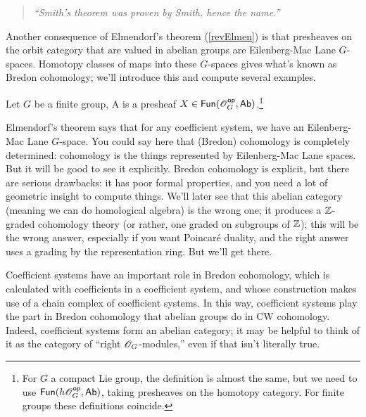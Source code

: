 
\begin{quote}\textit{
	``Smith's theorem was proven by Smith, hence the name.''
}\end{quote}
%
Another consequence of Elmendorf's theorem (\cref{revElmen}) is that presheaves on the orbit category that are
valued in abelian groups are Eilenberg-Mac Lane $G$-spaces. Homotopy classes of maps into these $G$-spaces gives
what's known as Bredon cohomology; we'll introduce this and compute several examples.
\begin{defn}
Let $G$ be a finite group, A  is a presheaf $X\in\mathsf{Fun}(\mathscr O_G^{\mathsf{op}}, \mathsf{Ab})$.\footnote{For $G$ a
compact Lie group, the definition is almost the same, but we need to use $\mathsf{Fun}(h\mathscr O_G^{\mathsf{op}}, \mathsf{Ab})$, taking presheaves
on the homotopy category. For finite groups these definitions coincide.}
\end{defn}
Elmendorf's theorem says that for any coefficient system, we have an Eilenberg-Mac Lane $G$-space. You could say
here that (Bredon) cohomology is completely determined: cohomology is the things represented by Eilenberg-Mac Lane
spaces. But it will be good to see it explicitly. Bredon cohomology is explicit, but there are serious drawbacks:
it has poor formal properties, and you need a lot of geometric insight to compute things. We'll later see that this
abelian category (meaning we can do homological algebra) is the wrong one; it produces a $\mathbb Z$-graded cohomology
theory (or rather, one graded on subgroups of $\mathbb Z$); this will be the wrong answer, especially if you want Poincaré
duality, and the right answer uses a grading by the representation ring. But we'll get there.

Coefficient systems have an important role in Bredon cohomology, which is calculated with coefficients in a
coefficient system, and whose construction makes use of a chain complex of coefficient systems. In this way,
coefficient systems play the part in Bredon cohomology that abelian groups do in CW cohomology. Indeed, coefficient
systems form an abelian category; it may be helpful to think of it as the category of ``right $\mathscr O_G$-modules,''
even if that isn't literally true.

